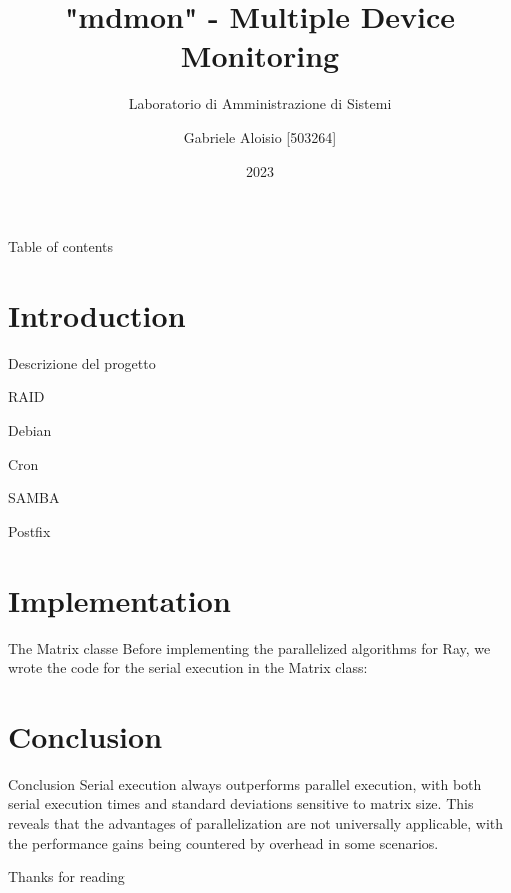 \documentclass{beamer}
\title{"mdmon" - Multiple Device Monitoring}
\subtitle{Laboratorio di Amministrazione di Sistemi}
\author{Gabriele Aloisio [503264]}
\institute{Università degli studi di Messina}
\date{2023}
\begin{document}
\maketitle

\begin{frame}{Table of contents}
    \tableofcontents
\end{frame}

\section{Introduction}
\begin{frame}{Descrizione del progetto}

\end{frame}

\begin{frame}{RAID}
\end{frame}

\begin{frame}{Debian}
\end{frame}

\begin{frame}{Cron}
\end{frame}

\begin{frame}{SAMBA}
\end{frame}

\begin{frame}{Postfix}
\end{frame}

\section{Implementation}
\begin{frame}{The Matrix classe}
    Before implementing the parallelized algorithms for Ray, we wrote the code for the serial execution in the \alert{Matrix} class:
\end{frame}

\section{Conclusion}
\begin{frame}[fragile]{Conclusion}
    Serial execution always outperforms parallel execution, with both serial execution times and standard deviations sensitive to matrix size. This reveals that the advantages of parallelization are not universally applicable, with the performance gains being countered by overhead in some scenarios.
\end{frame}

\begin{frame}[standout]
    Thanks for reading
    \\
    \Huge\smiley{}
\end{frame}
\end{document}

